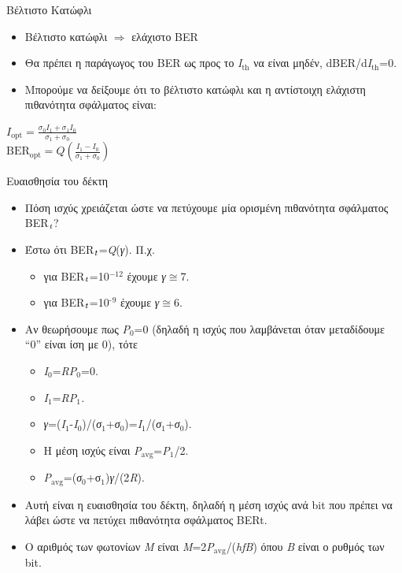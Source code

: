 \documentclass[11pt,aspectratio=169]{beamer}
\begin{document}
\begin{frame}[shrink=20,t]{Βέλτιστο Κατώφλι}
\begin{itemize}
\item Βέλτιστο κατώφλι \ensuremath{\Rightarrow} ελάχιστο BER
\item Θα πρέπει η παράγωγος του BER ως προς το \textit{I}$_{\text{th}}$ να είναι μηδέν, dBER/d\textit{Ι}$_{\text{th}}$=0.
\item Μπορούμε να δείξουμε ότι το βέλτιστο κατώφλι και η αντίστοιχη ελάχιστη πιθανότητα σφάλματος είναι:
\end{itemize}
\begin{center}
$\displaystyle I_{\mathrm{opt}}=\frac{\sigma_{0}I_{1}+\sigma_{1}I_{0}}{\sigma_{1}+\sigma_{0}}$\\[0.6ex]
$\displaystyle \mathrm{BER}_{\mathrm{opt}}=Q\left(\frac{I_{1}-I_{0}}{\sigma_{1}+\sigma_{0}}\right)$\\[0.6ex]
\end{center}
\end{frame}

\begin{frame}[shrink=20,t]{Ευαισθησία του δέκτη}
\begin{itemize}
\item Πόση ισχύς χρειάζεται ώστε να πετύχουμε μία ορισμένη πιθανότητα σφάλματος BER$_{\text{\textit{t}}}$?
\item Έστω ότι BER$_{\text{\textit{t}}}$=\textit{Q}(\textit{γ}). Π.χ.
\begin{itemize}
\item για BER$_{\text{\textit{t}}}$=10$^{-12}$ έχουμε \textit{γ}\ensuremath{\cong}7.
\item για BER$_{\text{\textit{t}}}$=10$^{\text{-}}$$^{\text{9}}$ έχουμε \textit{γ}\ensuremath{\cong}6.
\end{itemize}
\item Αν θεωρήσουμε πως \textit{P}$_{\text{0}}$=0 (δηλαδή η ισχύς που λαμβάνεται όταν μεταδίδουμε “0” είναι ίση με 0), τότε
\begin{itemize}
\item \textit{Ι}$_{\text{0}}$=\textit{RP}$_{\text{0}}$=0.
\item \textit{I}$_{\text{1}}$=\textit{RP}$_{\text{1}}$\textit{.}
\item \textit{γ}=(\textit{Ι}$_{\text{1}}$-\textit{Ι}$_{\text{0}}$)/(\textit{σ}$_{\text{1}}$+\textit{σ}$_{\text{0}}$)=\textit{Ι}$_{\text{1}}$/(\textit{σ}$_{\text{1}}$+\textit{σ}$_{\text{0}}$).
\item H μέση ισχύς είναι \textit{P}$_{\text{avg}}$=\textit{P}$_{\text{1}}$/2.
\item \textit{P}$_{\text{avg}}$=(\textit{σ}$_{\text{0}}$+σ$_{\text{1}}$)\textit{γ}/(2\textit{R}).
\end{itemize}
\item Αυτή είναι η ευαισθησία του δέκτη, δηλαδή η μέση ισχύς ανά bit που πρέπει να λάβει ώστε να πετύχει πιθανότητα σφάλματος BERt.
\item O αριθμός των φωτονίων \textit{Μ} είναι \textit{M}=2\textit{P}$_{\text{avg}}$/(\textit{hfB}) όπου \textit{B} είναι ο ρυθμός των bit.
\end{itemize}
\end{frame}
\end{document}
